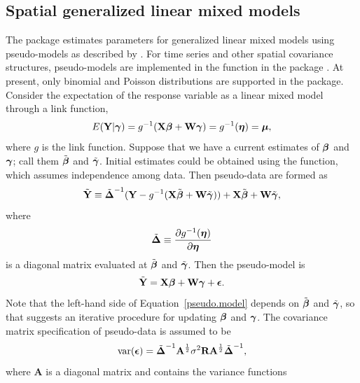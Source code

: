 \documentclass[nojss]{jss}
\def\bbeta{\mbox{\boldmath $\beta$}}
\def\bgamma{\mbox{\boldmath $\gamma$}}
\def\bepsilon{\mbox{\boldmath $\epsilon$}}
\def\bmu{\mbox{\boldmath $\mu$}}
\def\bldeta{\mbox{\boldmath $\eta$}}
\def\bDelta{\mbox{\boldmath $\Delta$}}
\def\bA{\textbf{A}}
\def\bY{\textbf{Y}}
\def\bX{\textbf{X}}
\def\bR{\textbf{R}}
\def\bW{\textbf{W}}
\begin{document}

\subsection{Spatial generalized linear mixed models}\label{SpGenLinMixMod}

The  package estimates parameters for generalized linear
mixed models using pseudo-models as described by
\citet{Wolf:Ocon:gene:1993}. For time series and other spatial
covariance structures, pseudo-models are implemented in the
 function in the  package
\citep{Vene:Ripl:mode:2002}.  At present, only binomial and Poisson
distributions are supported in the  package. Consider the
expectation of the response variable as a linear mixed model through a
link function,
%
%
\begin{equation} \label{glm.mean}
	 E(\bY|\bgamma) =
	   g^{-1}(\bX \bbeta + \bW \bgamma) =
	   g^{-1}(\bldeta) = \bmu,
\end{equation}
%
where $g$ is the link function. Suppose that we have a current
estimates of $\bbeta$ and $\bgamma$; call them $\tilde{\bbeta}$ and
$\tilde{\bgamma}$. Initial estimates could be obtained using the
 function, which assumes independence among data.  Then
pseudo-data are formed as
%
%
\begin{equation} \label{pseudo.data}
	\tilde{\bY} \equiv \tilde{\bDelta}^{-1}(\bY -
	  g^{-1}(\bX \tilde{\bbeta} + \bW \tilde{\bgamma})) +
	  \bX \tilde{\bbeta} + \bW \tilde{\bgamma},
\end{equation}
where
\[
   \tilde{\bDelta} \equiv
     \frac{\partial g^{-1}(\bldeta)}
     {\partial \bldeta}
\]
is a diagonal matrix evaluated at $\tilde{\bbeta}$ and $\tilde{\bgamma}$.
Then the pseudo-model is
%
%
\begin{equation} \label{pseudo.model}
	 \tilde{\bY} = \bX\bbeta + \bW\bgamma + \bepsilon.
\end{equation}
Note that the left-hand side of Equation~\ref{pseudo.model} depends on
$\tilde{\bbeta}$ and $\tilde{\bgamma}$, so that suggests an iterative
procedure for updating $\bbeta$ and $\bgamma$.  The covariance matrix
specification of pseudo-data is assumed to be
\[
   \textrm{var}(\bepsilon) =
     \tilde{\bDelta}^{-1}\bA^{\frac{1}{2}}\sigma^2\bR
       \bA^{\frac{1}{2}}\tilde{\bDelta}^{-1},
\]
where $\bA$ is a diagonal matrix and contains the variance functions
\end{document}
